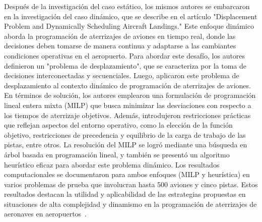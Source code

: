 \documentclass[letter, 10pt]{article}
\begin{document}
Despu\'es de la investigaci\'on del caso est\'atico, los mismos autores se embarcaron en la investigaci\'on del caso din\'amico, que se describe en el art\'iculo "Displacement Problem and Dynamically Scheduling Aircraft Landings." Este enfoque din\'amico aborda la programaci\'on de aterrizajes de aviones en tiempo real, donde las decisiones deben tomarse de manera continua y adaptarse a las cambiantes condiciones operativas en el aeropuerto. Para abordar este desaf\'io, los autores definieron un "problema de desplazamiento", que se caracteriza por la toma de decisiones interconectadas y secuenciales. Luego, aplicaron este problema de desplazamiento al contexto din\'amico de programaci\'on de aterrizajes de aviones. En t\'erminos de soluci\'on, los autores emplearon una formulaci\'on de programaci\'on lineal entera mixta (MILP) que busca minimizar las desviaciones con respecto a los tiempos de aterrizaje objetivos. Adem\'as, introdujeron restricciones pr\'acticas que reflejan aspectos del entorno operativo, como la elecci\'on de la funci\'on objetivo, restricciones de precedencia y equilibrio de la carga de trabajo de las pistas, entre otros. La resoluci\'on del MILP se logr\'o mediante una b\'usqueda en \'arbol basada en programaci\'on lineal, y tambi\'en se present\'o un algoritmo heur\'istico eficaz para abordar este problema din\'amico. Los resultados computacionales se documentaron para ambos enfoques (MILP y heur\'istica) en varios problemas de prueba que involucran hasta 500 aviones y cinco pistas. Estos resultados destacan la utilidad y aplicabilidad de las estrategias propuestas en situaciones de alta complejidad y dinamismo en la programaci\'on de aterrizajes de aeronaves en aeropuertos~\cite{Beasley2004}. \\
\end{document}
